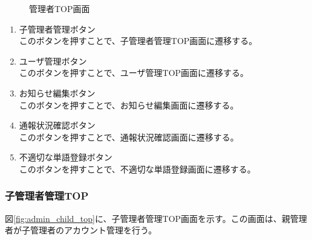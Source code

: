 \documentclass[a4j]{jarticle}
\begin{document}
\begin{figure}[H]
\centering
{}
\caption{管理者TOP画面}
\label{fig:admin_top}
\end{figure}
\begin{enumerate}
  \renewcommand{\labelenumi}{\textcircled{\scriptsize \theenumi}}

\item 子管理者管理ボタン\\
このボタンを押すことで、子管理者管理TOP画面に遷移する。

\item ユーザ管理ボタン\\
このボタンを押すことで、ユーザ管理TOP画面に遷移する。

\item お知らせ編集ボタン\\
このボタンを押すことで、お知らせ編集画面に遷移する。

\item 通報状況確認ボタン\\
このボタンを押すことで、通報状況確認画面に遷移する。

\item 不適切な単語登録ボタン\\
このボタンを押すことで、不適切な単語登録画面に遷移する。
\end{enumerate}

\subsubsection{子管理者管理TOP}
図\ref{fig:admin_child_top}に、子管理者管理TOP画面を示す。この画面は、親管理者が子管理者のアカウント管理を行う。
\end{document}

